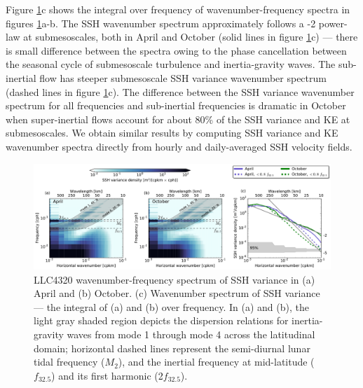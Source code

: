 \documentclass[grl]{agutex2015}
\begin{document}
\begin{article}
Figure \ref{fig4}c shows the integral over frequency
of wavenumber-frequency spectra in figures \ref{fig4}a-b. The
SSH wavenumber spectrum approximately follows a -2 power-law at submesoscales,
both in April and October (solid lines in figure \ref{fig4}c)  --- there is
small difference between the spectra owing to the phase cancellation between the
seasonal cycle of submesoscale turbulence and inertia-gravity waves. The sub-inertial flow
has steeper submesoscale SSH variance wavenumber spectrum (dashed lines in figure \ref{fig4}c).
 The difference between the SSH variance wavenumber spectrum for all frequencies and
 sub-inertial frequencies is dramatic in October when super-inertial flows account for
 about 80\% of the SSH variance and KE at submesoscales. We obtain similar results by computing
SSH variance and KE wavenumber spectra directly from hourly and daily-averaged
SSH velocity fields.

\begin{figure}[ht]
  \begin{center}
    \includegraphics[width=.8\textwidth]{figs/fig4.pdf}
 \caption{\small LLC4320 wavenumber-frequency spectrum of SSH variance in (a) April and (b) October.
          (c) Wavenumber spectrum of SSH variance --- the integral of (a) and (b) over frequency.
          In (a) and (b), the light gray shaded region depicts the dispersion relations for inertia-gravity
          waves from mode 1 through mode 4 across the latitudinal domain; horizontal dashed lines represent the semi-diurnal
          lunar tidal frequency ($M_2$), and the inertial frequency at mid-latitude
          ($f_{32.5}$) and its first harmonic (2$f_{32.5}$). }
  \label{fig4}
 \end{center}
\end{figure}


%
%
%


\end{article}
\end{document}

